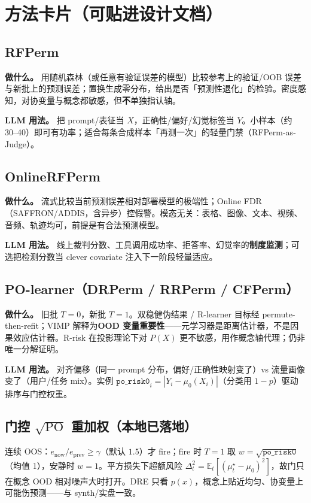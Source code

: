 \documentclass[11pt,a4paper,UTF8,fontset=none]{ctexart}
\begin{document}
\section{方法卡片（可贴进设计文档）}
\label{sec:cards}

\subsection{RFPerm}
\textbf{做什么。} 用随机森林（或任意有验证误差的模型）比较参考上的验证/OOB 误差与新批上的预测误差；置换生成零分布，给出是否「预测性退化」的检验。密度感知，对协变量与概念都敏感，但\textbf{不}单独指认轴。

\textbf{LLM 用法。} 把 prompt/表征当 \(X\)，正确性/偏好/幻觉标签当 \(Y\)。小样本（约 30--40）即可有功率；适合每条合成样本「再测一次」的轻量门禁（RFPerm-as-Judge）。

\subsection{OnlineRFPerm}
\textbf{做什么。} 流式比较当前预测误差相对部署模型的极端性；Online FDR（SAFFRON/ADDIS，含异步）控假警。模态无关：表格、图像、文本、视频、音频、轨迹均可，前提是有合法预测模型。

\textbf{LLM 用法。} 线上裁判分数、工具调用成功率、拒答率、幻觉率的\textbf{制度监测}；可选把检测分数当 clever covariate 注入下一阶段轻量适应。

\subsection{PO-learner（DRPerm / RRPerm / CFPerm）}
\textbf{做什么。} 旧批 \(T=0\)，新批 \(T=1\)。双稳健伪结果 / R-learner 目标经 permute-then-refit；VIMP 解释为\textbf{OOD 变量重要性}——元学习器是距离估计器，不是因果效应估计器。R-risk 在投影理论下对 \(P(X)\) 更不敏感，用作概念轴代理；仍非唯一分解证明。

\textbf{LLM 用法。} 对齐偏移（同一 prompt 分布，偏好/正确性映射变了）vs 流量画像变了（用户/任务 mix）。实例 \(\texttt{po\_risk0}_i=|Y_i-\mu_0(X_i)|\)（分类用 \(1-p\)）驱动排序与门控权重。

\subsection{门控 \(\sqrt{\mathrm{PO}}\) 重加权（本地已落地）}
连续 OOS：\(e_{\mathrm{now}}/e_{\mathrm{prev}}\ge\gamma\)（默认 \(1.5\)）才 fire；fire 时 \(T=1\) 取 \(w=\sqrt{\texttt{po\_risk0}}\)（均值 1），安静时 \(w=1\)。平方损失下超额风险 \(\Delta_t^2=\mathbb{E}_t[(\mu_t^\star-\mu_0)^2]\)，故门只在概念 OOD 相对噪声大时打开。DRE 只看 \(p(x)\)，概念上贴近均匀、协变量上可能伤预测——与 synth/实盘一致。
\end{document}
